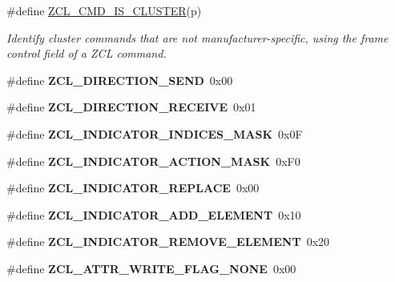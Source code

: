 \begin{DoxyCompactItemize}
\#define \hyperlink{group__zcl_gacf3dd5326c4c70dcca078b1eae0c3661}{Z\-C\-L\-\_\-\-C\-M\-D\-\_\-\-I\-S\-\_\-\-C\-L\-U\-S\-T\-E\-R}(p)
\begin{DoxyCompactList}\small\item\em Identify cluster commands that are not manufacturer-\/specific, using the frame control field of a Z\-C\-L command. \end{DoxyCompactList}\item 
\hypertarget{group__zcl_gad579227f53a05118d43fccab9a651cd7}{\#define {\bfseries Z\-C\-L\-\_\-\-D\-I\-R\-E\-C\-T\-I\-O\-N\-\_\-\-S\-E\-N\-D}~0x00}\label{group__zcl_gad579227f53a05118d43fccab9a651cd7}

\item 
\hypertarget{group__zcl_gad5c68f751f625199d813004d16a77d30}{\#define {\bfseries Z\-C\-L\-\_\-\-D\-I\-R\-E\-C\-T\-I\-O\-N\-\_\-\-R\-E\-C\-E\-I\-V\-E}~0x01}\label{group__zcl_gad5c68f751f625199d813004d16a77d30}

\item 
\hypertarget{group__zcl_ga6853d1fba6ab5e122dee4befe8e6d5e6}{\#define {\bfseries Z\-C\-L\-\_\-\-I\-N\-D\-I\-C\-A\-T\-O\-R\-\_\-\-I\-N\-D\-I\-C\-E\-S\-\_\-\-M\-A\-S\-K}~0x0\-F}\label{group__zcl_ga6853d1fba6ab5e122dee4befe8e6d5e6}

\item 
\hypertarget{group__zcl_ga90d8c7d7dc7b8aa4b27ab1a8a3656ee3}{\#define {\bfseries Z\-C\-L\-\_\-\-I\-N\-D\-I\-C\-A\-T\-O\-R\-\_\-\-A\-C\-T\-I\-O\-N\-\_\-\-M\-A\-S\-K}~0x\-F0}\label{group__zcl_ga90d8c7d7dc7b8aa4b27ab1a8a3656ee3}

\item 
\hypertarget{group__zcl_ga708c678fc0321c8f3cfdc6faac3dbf33}{\#define {\bfseries Z\-C\-L\-\_\-\-I\-N\-D\-I\-C\-A\-T\-O\-R\-\_\-\-R\-E\-P\-L\-A\-C\-E}~0x00}\label{group__zcl_ga708c678fc0321c8f3cfdc6faac3dbf33}

\item 
\hypertarget{group__zcl_gada825912c939a0b47ab998f1b64d1e4f}{\#define {\bfseries Z\-C\-L\-\_\-\-I\-N\-D\-I\-C\-A\-T\-O\-R\-\_\-\-A\-D\-D\-\_\-\-E\-L\-E\-M\-E\-N\-T}~0x10}\label{group__zcl_gada825912c939a0b47ab998f1b64d1e4f}

\item 
\hypertarget{group__zcl_ga0793be06976a8d352c95a532761e66d7}{\#define {\bfseries Z\-C\-L\-\_\-\-I\-N\-D\-I\-C\-A\-T\-O\-R\-\_\-\-R\-E\-M\-O\-V\-E\-\_\-\-E\-L\-E\-M\-E\-N\-T}~0x20}\label{group__zcl_ga0793be06976a8d352c95a532761e66d7}

\item 
\hypertarget{group__zcl_ga3e55f9168585bd3f3012da69348c7e4e}{\#define {\bfseries Z\-C\-L\-\_\-\-A\-T\-T\-R\-\_\-\-W\-R\-I\-T\-E\-\_\-\-F\-L\-A\-G\-\_\-\-N\-O\-N\-E}~0x00}\label{group__zcl_ga3e55f9168585bd3f3012da69348c7e4e}


\end{DoxyCompactItemize}
